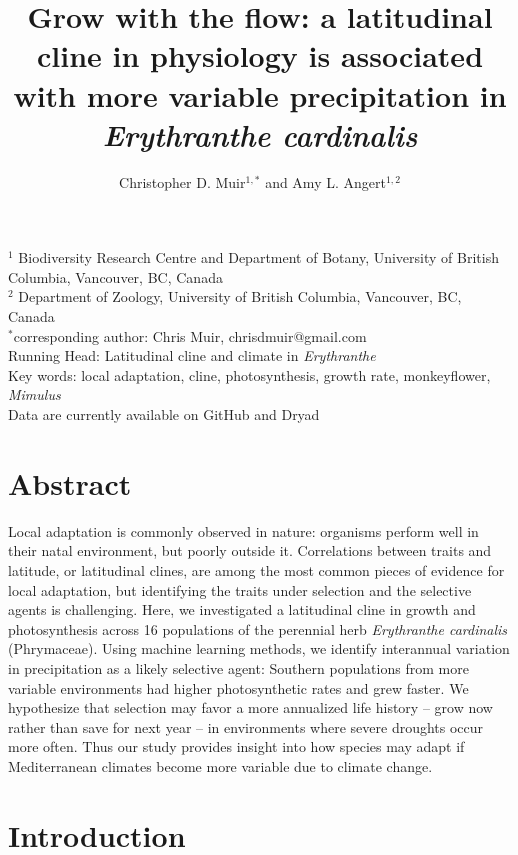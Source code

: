 \documentclass[11pt, oneside]{article}
\title{Grow with the flow: a latitudinal cline in physiology is associated with more variable precipitation in \textit{Erythranthe cardinalis}}
\author{Christopher D. Muir$^{1,*}$ and Amy L. Angert$^{1,2}$}
\date{}
\begin{document}

\maketitle

$^1$ Biodiversity Research Centre and Department of Botany, University of British Columbia, Vancouver, BC, Canada \\
$^2$ Department of Zoology, University of British Columbia, Vancouver, BC, Canada \\
$^*$corresponding author: Chris Muir, chrisdmuir@gmail.com \\

Running Head: Latitudinal cline and climate in \textit{Erythranthe} \\

Key words: local adaptation, cline, photosynthesis, growth rate, monkeyflower, \textit{Mimulus} \\

Data are currently available on GitHub and Dryad \citep{Muir_Angert_2017} \\

\clearpage

\section*{Abstract}

Local adaptation is commonly observed in nature: organisms perform well in their natal environment, but poorly outside it. Correlations between traits and latitude, or latitudinal clines, are among the most common pieces of evidence for local adaptation, but identifying the traits under selection and the selective agents is challenging. Here, we investigated a latitudinal cline in growth and photosynthesis across 16 populations of the perennial herb \textit{Erythranthe cardinalis} (Phrymaceae). Using machine learning methods, we identify interannual variation in precipitation as a likely selective agent: Southern populations from more variable environments had higher photosynthetic rates and grew faster. We hypothesize that selection may favor a more annualized life history -- grow now rather than save for next year -- in environments where severe droughts occur more often. Thus our study provides insight into how species may adapt if Mediterranean climates become more variable due to climate change.

\section*{Introduction}
\end{document}
